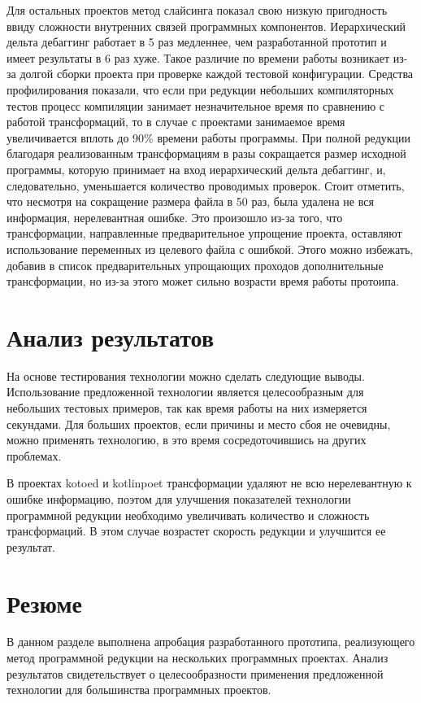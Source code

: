 Для остальных проектов метод слайсинга показал свою низкую пригодность ввиду сложности внутренних связей программных компонентов. Иерархический дельта дебаггинг работает в 5 раз медленнее, чем разработанной прототип и имеет результаты в 6 раз хуже. Такое различие по времени работы возникает из-за долгой сборки проекта при проверке каждой тестовой конфигурации. Средства профилирования показали, что если при редукции небольших компиляторных тестов процесс компиляции занимает незначительное время по сравнению с работой трансформаций, то в случае с проектами занимаемое время увеличивается вплоть до 90\% времени работы программы. При полной редукции благодаря реализованным трансформациям в разы сокращается размер исходной программы, которую принимает на вход иерархический дельта дебаггинг, и, следовательно, уменьшается количество проводимых проверок. Стоит отметить, что несмотря на сокращение размера файла в 50 раз, была удалена не вся информация, нерелевантная ошибке. Это произошло из-за того, что трансформации, направленные предварительное упрощение проекта, оставляют использование переменных из целевого файла с ошибкой. Этого можно избежать, добавив в список предварительных упрощающих проходов дополнительные трансформации, но из-за этого может сильно возрасти время работы протоипа.


\section{Анализ результатов}
На основе тестирования технологии можно сделать следующие выводы. Использование предложенной технологии является целесообразным для небольших тестовых примеров, так как время работы на них измеряется секундами. Для больших проектов, если причины и место сбоя не очевидны, можно применять технологию, в это время сосредоточившись на других проблемах.

В проектах kotoed и kotlinpoet трансформации удаляют не всю нерелевантную к ошибке информацию, поэтом для улучшения показателей технологии программной редукции необходимо увеличивать количество и сложность трансформаций. В этом случае возрастет скорость редукции и улучшится ее результат.

\section{Резюме}
В данном разделе выполнена апробация разработанного прототипа, реализующего метод программной редукции на нескольких программных проектах.
Анализ результатов свидетельствует о целесообразности применения предложенной технологии  для большинства программных проектов.